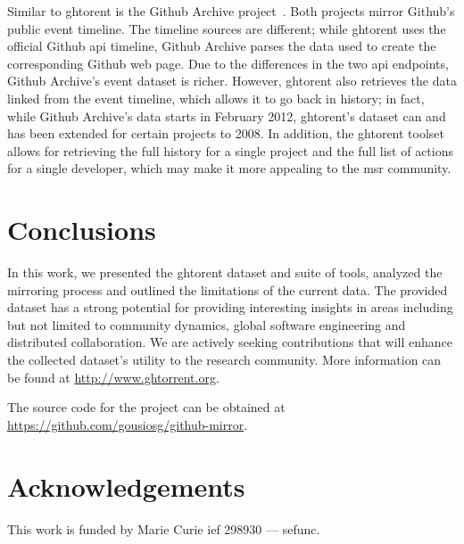 \documentclass[conference,letter]{IEEEtran}
\begin{document}
Similar to {\sc ght}orent is the Github Archive project~\cite{Grigo13}.  Both
projects mirror Github's public event timeline. The timeline sources are
different; while {\sc ght}orent uses the official Github {\sc api} timeline, Github
Archive parses the data used to create the corresponding Github web page.  Due
to the differences in the two {\sc api} endpoints, Github Archive's event
dataset is richer.  However, {\sc ght}orent also retrieves the data linked from the
event timeline, which allows it to go back in history; in fact, while Github
Archive's data starts in February 2012, {\sc ght}orent's dataset can and has been
extended for certain projects to 2008.  In addition, the {\sc ght}orent toolset
allows for retrieving the full history for a single project and the full list of
actions for a single developer, which may make it more appealing to the {\sc
msr} community.

\section{Conclusions}

In this work, we presented the {\sc ght}orent dataset and suite of tools, analyzed
the mirroring process and outlined the limitations of the current data.  The
provided dataset has a strong potential for providing interesting insights in
areas including but not limited to community dynamics, global software
engineering and distributed collaboration. We are actively seeking contributions
that will enhance the collected dataset's utility to the research community. 
More information can be found at \url{http://www.ghtorrent.org}.

The source code for the project can be obtained at \url{https://github.com/gousiosg/github-mirror}.

\section*{Acknowledgements}
This work is funded by Marie Curie {\sc ief} 298930 --- {\sc sefunc}.



\end{document}
